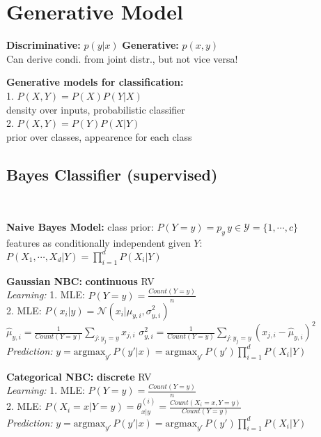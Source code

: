 

\section{Generative Model}

    \textbf{Discriminative:} $p(y|x)$ 
    \textbf{Generative:} $p(x, y)$ \\
    Can derive condi. from joint distr., but not vice versa!

    \textbf{Generative models for classification:}\\
    1. $P(X,Y) = P(X)P(Y|X)$ \\ density over inputs, probabilistic classifier\\
    2. $P(X,Y) = P(Y)P(X|Y)$ \\ prior over classes, appearence for each class\\

\subsection{Bayes Classifier (supervised)}\


    \textbf{Naive Bayes Model:} 
    class prior: $P(Y=y) = p_y \, y \in \mathcal{Y} = \{1, \cdots , c \}$ \\
    features as conditionally independent given $Y$: $P(X_1, \cdots , X_d|Y) = \prod_{i=1}^d P(X_i|Y)$
    
    \textbf{Gaussian NBC:} \textbf{continuous} RV \\
    \textit{Learning:} 1. MLE: $P(Y=y) = \frac{Count(Y=y)}{n}$ \\ 
    2. MLE: $P(x_i|y) = \mathcal{N}(x_i|\mu_{y,i}, \sigma_{y,i}^2)$\\
    $\hat{\mu}_{y,i} = \frac{1}{Count(Y=y)} \sum_{j: y_j=y} x_{j,i}$
    $\sigma_{y,i}^2 = \frac{1}{Count(Y=y)} \sum_{j: y_j=y} (x_{j,i} - \hat{\mu}_{y,i})^2$\\
    \textit{Prediction:} $y = \mathrm{argmax}_{y'}\, P(y'|x) = \mathrm{argmax}_{y'}\, P(y')\prod_{i=1}^d P(X_i|Y)$

    \textbf{Categorical NBC:} \textbf{discrete} RV \\
    \textit{Learning:} 1. MLE: $P(Y=y) = \frac{Count(Y=y)}{n}$ \\ 
    2. MLE: $P(X_i = x|Y = y) = \theta_{x|y}^{(i)} = \frac{Count(X_i = x, Y = y)}{Count(Y = y)}$\\
    \textit{Prediction:} $y = \mathrm{argmax}_{y'}\, P(y'|x) = \mathrm{argmax}_{y'}\, P(y')\prod_{i=1}^d P(X_i|Y)$

